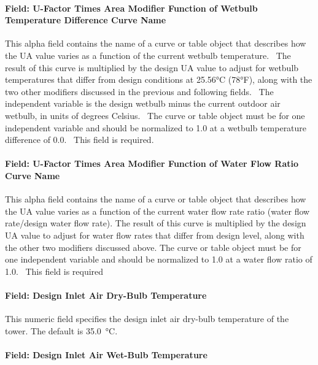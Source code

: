 \paragraph{Field: U-Factor Times Area Modifier Function of Wetbulb Temperature Difference Curve Name}\label{field-u-factor-times-area-modifier-function-of-wetbulb-temperature-difference-curve-name}

This alpha field contains the name of a curve or table object that describes how the UA value varies as a function of the current wetbulb temperature.~ The result of this curve is multiplied by the design UA value to adjust for wetbulb temperatures that differ from design conditions at 25.56°C (78°F), along with the two other modifiers discussed in the previous and following fields.~ The independent variable is the design wetbulb minus the current outdoor air wetbulb, in units of degrees Celsius.~ The curve or table object must be for one independent variable and should be normalized to 1.0 at a wetbulb temperature difference of 0.0.~ This field is required.

\paragraph{Field: U-Factor Times Area Modifier Function of Water Flow Ratio Curve Name}\label{field-u-factor-times-area-modifier-function-of-water-flow-ratio-curve-name}

This alpha field contains the name of a curve or table object that describes how the UA value varies as a function of the current water flow rate ratio (water flow rate/design water flow rate). The result of this curve is multiplied by the design UA value to adjust for water flow rates that differ from design level, along with the other two modifiers discussed above. The curve or table object must be for one independent variable and should be normalized to 1.0 at a water flow ratio of 1.0.~ This field is required

\paragraph{Field: Design Inlet Air Dry-Bulb Temperature}\label{field-design-inlet-air-drybulb-temperature-2}

This numeric field specifies the design inlet air dry-bulb temperature of the tower. The default is \SI{35.0}{\celsius}.

\paragraph{Field: Design Inlet Air Wet-Bulb Temperature}\label{field-design-inlet-air-wetbulb-temperature-2}

